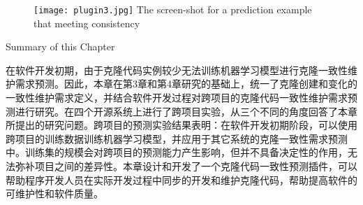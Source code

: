 \begin{figure}[h]
\centering
\texttt{[image: plugin3.jpg]}
{The screen-shot for a prediction example that meeting consistency}
\vspace{-1em}
\end{figure}


{Summary of this Chapter}

在软件开发初期，由于克隆代码实例较少无法训练机器学习模型进行克隆一致性维护需求预测。因此，本章在第3章和第4章研究的基础上，统一了克隆创建和变化的一致性维护需求定义，并结合软件开发过程对跨项目的克隆代码一致性维护需求预测进行研究。在四个开源系统上进行了跨项目实验，从三个不同的角度回答了本章所提出的研究问题。跨项目的预测实验结果表明：在软件开发初期阶段，可以使用跨项目的训练数据训练机器学习模型，并应用于其它系统的克隆一致性需求预测中。训练集的规模会对跨项目的预测能力产生影响，但并不具备决定性的作用，无法弥补项目之间的差异性。本章设计和开发了一个克隆代码一致性预测插件，可以帮助程序开发人员在实际开发过程中同步的开发和维护克隆代码，帮助提高软件的可维护性和软件质量。